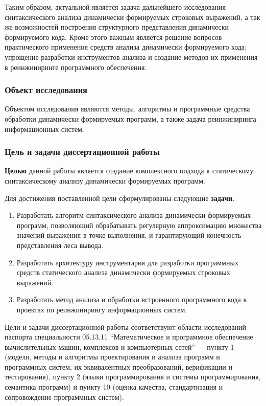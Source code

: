 Таким образом, актуальной является задача дальнейшего исследования синтаксического анализа динамически формируемых строковых выражений, а так же возможностей построения структурного представления динамически формируемого кода. Кроме этого важным является решение вопросов практического применения средств анализа динамически формируемого кода: упрощение разработки инструментов анализа и создание методов их применения в реинжиниринге программного обеспечения.

\subsubsection*{\large{Объект исследования}}

 Объектом исследования являются методы, алгоритмы и программные средства обработки динамически формируемых программ, а также задача реинжиниринга информационных систем.

\subsubsection*{\large{Цель и задачи диссертационной работы}}

\textbf{Целью} данной работы является создание комплексного подхода к статическому синтаксическому анализу динамически формируемых программ.

Для достижения поставленной цели сформулированы следующие \textbf{задачи}.
\begin{enumerate}
    \item Разработать алгоритм синтаксического анализа динамически формируемых программ, позволяющий обрабатывать регулярную аппроксимацию множества значений выражения в точке выполнения, и гарантирующий конечность представления леса вывода.
    \item Разработать архитектуру инструментария для разработки программных средств статического анализа динамически формируемых строковых выражений.
    \item Разработать метод анализа и обработки встроенного программного кода в проектах по реинжинирингу информационных систем.
\end{enumerate}

Цели и задачи диссертационной работы соответствуют области исследований паспорта специальности 05.13.11 ``Математическое и программное обеспечение вычислительных машин, комплексов и компьютерных сетей'' --- пункту 
1 (модели, методы и алгоритмы проектирования и анализа программ и программных систем, их эквивалентных преобразований, верификации и тестирования),
пункту 2 (языки программирования и системы программирования, семантика программ) и пункту 10 (оценка качества, стандартизация и сопровождение программных систем).

